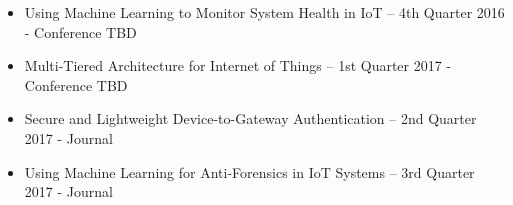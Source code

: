 \documentclass[../main.tex]{subfiles}
\begin{document}
\begin{itemize}
    \item Using Machine Learning to Monitor System Health in IoT  – 4th Quarter 2016 - Conference TBD
    \item Multi-Tiered Architecture for Internet of Things – 1st Quarter 2017 - Conference TBD
    \item Secure and Lightweight Device-to-Gateway Authentication – 2nd Quarter 2017 - Journal
    \item Using Machine Learning for Anti-Forensics in IoT Systems – 3rd Quarter 2017 - Journal
\end{itemize}
\end{document}
